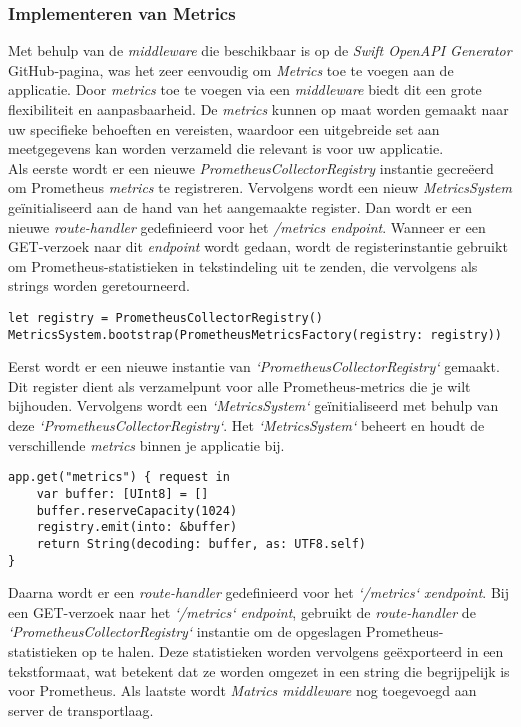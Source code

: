 \subsubsection{Implementeren van Metrics}
Met behulp van de \textit{middleware} die beschikbaar is op de \textit{Swift OpenAPI Generator} GitHub-pagina, was het zeer eenvoudig om \textit{Metrics} toe te voegen aan de applicatie.  Door \textit{metrics} toe te voegen via een \textit{middleware} biedt dit een grote flexibiliteit en aanpasbaarheid. De \textit{metrics} kunnen op maat worden gemaakt naar uw specifieke behoeften en vereisten, waardoor een uitgebreide set aan meetgegevens kan worden verzameld die relevant is voor uw applicatie.
 \\
Als eerste wordt er een nieuwe \textit{PrometheusCollectorRegistry} instantie gecreëerd om Prometheus \textit{metrics} te registreren. Vervolgens wordt een nieuw \textit{MetricsSystem} geïnitialiseerd aan de hand van het aangemaakte register. Dan wordt er een nieuwe \textit{route-handler} gedefinieerd voor het \textit{/metrics endpoint}. Wanneer er een GET-verzoek naar dit \textit{endpoint} wordt gedaan, wordt de registerinstantie gebruikt om Prometheus-statistieken in tekstindeling uit te zenden, die vervolgens als strings worden geretourneerd.

\begin{lstlisting}[caption=booksServiceServer file]
let registry = PrometheusCollectorRegistry()
MetricsSystem.bootstrap(PrometheusMetricsFactory(registry: registry))
\end{lstlisting}
Eerst wordt er een nieuwe instantie van \textit{`PrometheusCollectorRegistry`} gemaakt. Dit register dient als verzamelpunt voor alle Prometheus-metrics die je wilt bijhouden. Vervolgens wordt een \textit{`MetricsSystem`} geïnitialiseerd met behulp van deze \textit{`PrometheusCollectorRegistry`}. Het \textit{`MetricsSystem`} beheert en houdt de verschillende \textit{metrics} binnen je applicatie bij.

\begin{lstlisting}[caption=booksServiceServer file]
app.get("metrics") { request in
    var buffer: [UInt8] = []
    buffer.reserveCapacity(1024)
    registry.emit(into: &buffer)
    return String(decoding: buffer, as: UTF8.self)
}

\end{lstlisting}
Daarna wordt er een \textit{route-handler} gedefinieerd voor het \textit{`/metrics` xendpoint}. Bij een GET-verzoek naar het \textit{`/metrics` endpoint}, gebruikt de \textit{route-handler} de \textit{`PrometheusCollectorRegistry`} instantie om de opgeslagen Prometheus-statistieken op te halen. Deze statistieken worden vervolgens geëxporteerd in een tekstformaat, wat betekent dat ze worden omgezet in een string die begrijpelijk is voor Prometheus. Als laatste wordt \textit{Matrics middleware} nog toegevoegd aan server de transportlaag. 

